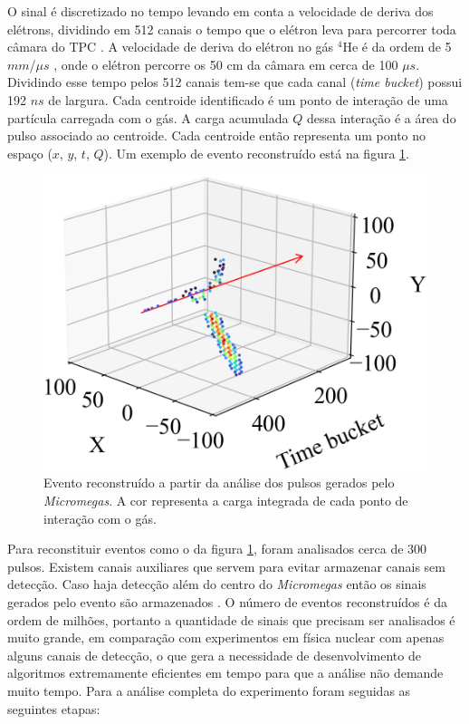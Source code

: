 \documentclass[a4paper,12pt,oneside]{book}
\begin{document}
\par O sinal é discretizado no tempo levando em conta a velocidade de deriva dos elétrons, dividindo em 512 canais o tempo que o elétron leva para percorrer toda câmara do TPC \cite{josh_bradt, pattpc}. A velocidade de deriva do elétron no gás $^4$He é da ordem de 5 $mm$/$\mu s$  \cite{pattpc}, onde o elétron percorre os 50 cm da câmara em cerca de 100 $\mu s$. Dividindo esse tempo pelos 512 canais tem-se que cada canal (\textit{time bucket}) possui 192 $ns$ de largura. Cada centroide identificado é um ponto de interação de uma partícula carregada com o gás. A carga acumulada $Q$ dessa interação é a área do pulso associado ao centroide. Cada centroide então representa um ponto no espaço ($x$, $y$, $t$, $Q$). Um exemplo de evento reconstruído está na figura \ref{fig:event_cap_exp}.

\begin{figure}[H]
    \centering
    \includegraphics[scale = 0.40]{figs/event_cap_exp.png}
    \caption{Evento reconstruído a partir da análise dos pulsos gerados pelo \textit{Micromegas}. A cor representa a carga integrada de cada ponto de interação com o gás.}
    \label{fig:event_cap_exp}
\end{figure}

\par Para reconstituir eventos como o da figura \ref{fig:event_cap_exp}, foram analisados cerca de 300 pulsos. Existem canais auxiliares que servem para evitar armazenar canais sem detecção. Caso haja detecção além do centro do \textit{Micromegas} então os sinais gerados pelo evento são armazenados \cite{josh_bradt, attpc}. O número de eventos reconstruídos é da ordem de milhões, portanto a quantidade de sinais que precisam ser analisados é muito grande, em comparação com experimentos em física nuclear com apenas alguns canais de detecção, o que gera a necessidade de desenvolvimento de algoritmos extremamente eficientes em tempo para que a análise não demande muito tempo. Para a análise completa do experimento foram seguidas as seguintes etapas:
\end{document}
